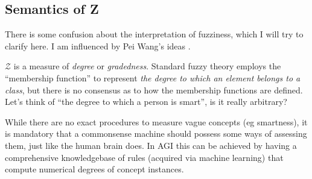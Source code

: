 


%

\subsection{Semantics of Z}

There is some confusion about the interpretation of fuzziness, which I will try to clarify here.  I am influenced by Pei Wang's ideas \citep*{Wang2006}.

$\mathcal{Z}$ is a measure of \textit{degree} or \textit{gradedness}.  Standard fuzzy theory employs the ``membership function'' to represent \textit{the degree to which an element belongs to a class}, but there is no consensus as to how the membership functions are defined.  Let's think of ``the degree to which a person is smart'', is it really arbitrary?

While there are no exact procedures to measure vague concepts (eg smartness), it is mandatory that a commonsense machine should possess some ways of assessing them, just like the human brain does.  In AGI this can be achieved by having a comprehensive knowledgebase of rules (acquired via machine learning) that compute numerical degrees of concept instances.


